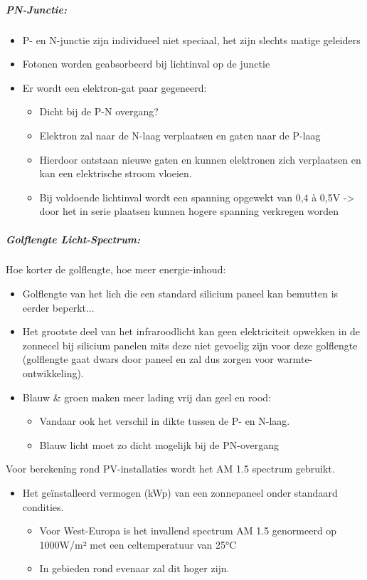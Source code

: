 \documentclass[12pt]{article}
\begin{document}
\subparagraph{PN-Junctie:}\begin{itemize}
    \item P- en N-junctie zijn individueel niet speciaal, het zijn slechts matige
    geleiders
    \item Fotonen worden geabsorbeerd bij lichtinval op de junctie 
    \item Er wordt een elektron-gat paar gegeneerd:\begin{itemize}
        \item Dicht bij de P-N overgang?
        \item Elektron zal naar de N-laag verplaatsen en gaten naar de P-laag
        \item Hierdoor ontstaan nieuwe gaten en kunnen elektronen zich
        verplaatsen en kan een elektrische stroom vloeien.
        \item Bij voldoende lichtinval wordt een spanning opgewekt van 0,4 à
        0,5V -> door het in serie plaatsen kunnen hogere spanning
        verkregen worden
    \end{itemize}
\end{itemize}
\subparagraph{Golflengte Licht-Spectrum:} 
Hoe korter de golflengte, hoe meer energie-inhoud:
\begin{itemize}
    \item[] Golflengte van het lich die een standard silicium paneel kan bemutten is eerder beperkt... 
    \item Het grootste deel van het infraroodlicht kan geen elektriciteit opwekken in de zonnecel bij silicium panelen mits deze niet gevoelig zijn voor deze golflengte (golflengte gaat dwars door paneel en zal dus zorgen voor warmte-ontwikkeling).
    \item Blauw \& groen maken meer lading vrij dan geel en rood:\begin{itemize}
        \item Vandaar ook het verschil in dikte tussen de P- en N-laag.
        \item Blauw licht moet zo dicht mogelijk bij de PN-overgang
    \end{itemize}
\end{itemize}
Voor berekening rond PV-installaties wordt het AM 1.5 spectrum gebruikt.
\begin{itemize}
    \item Het geïnstalleerd vermogen (kWp) van een zonnepaneel
    onder standaard condities.\begin{itemize}
        \item Voor West-Europa is het invallend spectrum AM 1.5
        genormeerd op 1000W/m² met een celtemperatuur van
        25°C
        \item In gebieden rond evenaar zal dit hoger zijn.
    \end{itemize}
\end{itemize}
\end{document}
